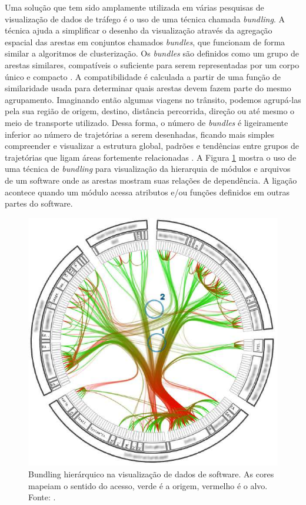  Uma solução que tem sido amplamente utilizada em várias pesquisas de
visualização de dados de tráfego é o uso de uma técnica chamada
\emph{bundling}. A técnica ajuda a simplificar o desenho da visualização
através da agregação espacial das arestas em conjuntos chamados
\emph{bundles}, que funcionam de forma similar a algoritmos de clusterização. Os \emph{bundles} são
definidos como um grupo de arestas similares, compatíveis o suficiente para
serem representadas por um corpo único e compacto \citep{Lhuillier2017}. A
compatibilidade é calculada a partir de uma função de similaridade usada para
determinar quais arestas devem fazem parte do mesmo agrupamento.
Imaginando então algumas viagens no trânsito, podemos agrupá-las pela sua
região de origem, destino, distância percorrida, direção ou até mesmo o meio de
transporte utilizado.  Dessa forma, o número de \emph{bundles} é ligeiramente
inferior ao número de trajetórias a serem desenhadas, ficando mais simples
compreender e visualizar a estrutura global, padrões e tendências entre grupos
de trajetórias que ligam áreas fortemente relacionadas \citep{Zhou2013}.  A
Figura \ref{fig:bundling-hierarquico} mostra o uso de uma técnica de
\emph{bundling} para visualização da hierarquia de módulos e arquivos de um
software onde as arestas mostram suas relações de dependência. A ligação
acontece quando um módulo acessa atributos e/ou funções definidos em outras partes
do software.

\begin{figure}[!htb]
  \centering
  \includegraphics[width=.5\textwidth]{../figuras/hbundling.png}
  \caption[Bundling hierárquico na visualização de dados de software]{Bundling hierárquico na visualização de dados de software. As cores mapeiam
o sentido do acesso, verde é a origem, vermelho é o alvo. Fonte: \citep{Holten2006}.}
  \label{fig:bundling-hierarquico}
\end{figure}

